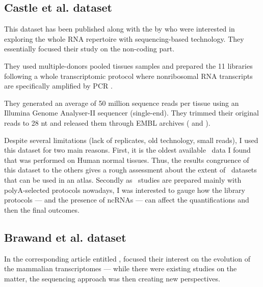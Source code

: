 \subsection{Castle et al. dataset}

This dataset has been published along with the 
by \citet{castleData} who were interested in exploring the whole RNA repertoire
with sequencing-based technology. They essentially focused their study
on the non-coding part.
\begin{comment}
and found that
while \glspl{mRNA} could be highly tissue-specific, \glspl{ncRNA} have generally
greater tissue-specific expression patterns.
\end{comment}

They used multiple-donors pooled tissues samples %
and prepared the 11 libraries following a whole transcriptomic protocol
where nonribosomal \gls{RNA} transcripts are
specifically amplified by \gls{PCR} \citep{Armour:2009}.

They generated an average of 50 million sequence reads per tissue
using an Illumina Genome Analyser-II sequencer (single-end).
They trimmed their original reads to 28 \gls{nt}
and released them through EMBL archives (
and ).

Despite several limitations (lack of replicates, old technology, small reads),
I used this dataset for two main reasons. First, it is the oldest available
\Rnaseq\ data I found that was performed on Human normal tissues. Thus, the
results congruence of this dataset to the others gives a rough assessment about
the extent of \Rnaseq\ datasets that can be used in an atlas. Secondly as
\Rnaseq\ studies are prepared mainly with polyA-selected protocols nowadays,
I was interested to gauge how the library protocols --- and the presence of
\glspl{ncRNA} --- can affect the quantifications and then the final outcomes.


\subsection{Brawand et al. dataset}

In the corresponding article entitled ,
\citet{VTpaper} focused their interest on the
evolution of the mammalian transcriptomes --- while there were existing studies
on the matter, the sequencing approach was then creating new perspectives.

